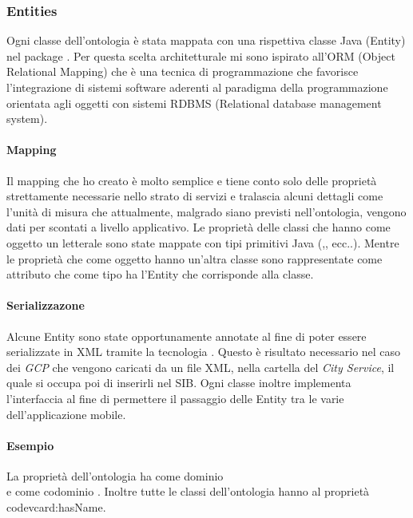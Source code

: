 
\subsubsection{Entities}

Ogni classe dell'ontologia è stata mappata con una rispettiva classe Java (Entity) nel package  . Per questa scelta architetturale mi sono ispirato all'ORM (Object Relational Mapping) che è una tecnica di programmazione che favorisce l'integrazione di sistemi software aderenti al paradigma della programmazione orientata agli oggetti con sistemi RDBMS (Relational database management system). %

\paragraph{Mapping} Il mapping che ho creato è molto semplice e tiene conto solo delle proprietà strettamente necessarie nello strato di servizi e tralascia alcuni dettagli come l'unità di misura che attualmente, malgrado siano previsti nell'ontologia, vengono dati per scontati a livello applicativo.
Le proprietà delle classi che hanno come oggetto un letterale sono state mappate con tipi primitivi Java (,, ecc..). Mentre le proprietà che come oggetto hanno un'altra classe sono rappresentate come attributo che come tipo ha l'Entity
che corrisponde alla classe. 

\paragraph{Serializzazone} Alcune Entity sono state opportunamente annotate al fine di poter essere serializzate in XML tramite la tecnologia . Questo è risultato necessario nel caso dei \emph{GCP} che vengono caricati da un file XML, nella cartella del \emph{City Service}, il quale si occupa poi di inserirli nel SIB. Ogni classe inoltre implementa l'interfaccia  al fine di permettere il passaggio delle Entity tra le varie  dell'applicazione mobile.

\paragraph{Esempio}

La proprietà dell'ontologia  ha come dominio \\  e come codominio . Inoltre tutte le classi dell'ontologia hanno al proprietà code{vcard:hasName}.

